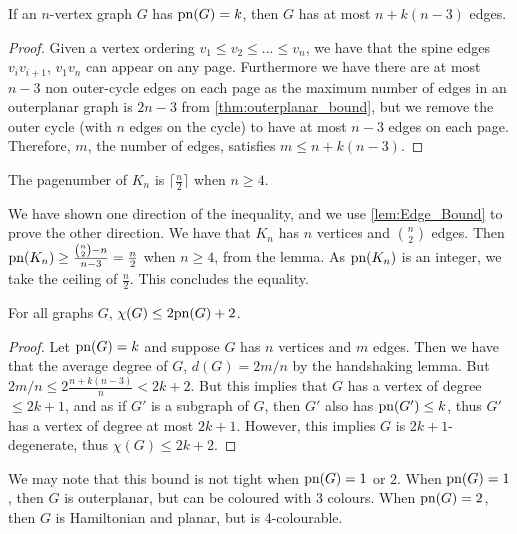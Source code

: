 \begin{lemma}\label{lem:Edge_Bound}
	If an $n$-vertex graph $G$ has $\text{pn}(G) = k$, then $G$ has at most $n + k(n-3)$ edges.
\end{lemma}
\begin{proof}
	Given a vertex ordering $v_1 \leq v_2 \leq ... \leq v_n$, we have that the spine edges $v_i v_{i + 1}$, $v_1 v_n$  can appear on any page. Furthermore we have there are at most $n-3$ non outer-cycle edges on each page as the maximum number of edges in an outerplanar graph is $2n - 3$ from \cref{thm:outerplanar_bound}, but we remove the outer cycle (with $n$ edges on the cycle) to have at most $n-3$ edges on each page. Therefore, $m$, the number of edges, satisfies $m \leq n + k (n - 3)$. 
\end{proof}

\begin{corollary}
	The pagenumber of $K_n$ is $\lceil \frac{n}{2} \rceil$ when $n \geq 4$.
\end{corollary}
We have shown one direction of the inequality, and we use \cref{lem:Edge_Bound} to prove the other direction. We have that $K_n$ has $n$ vertices and $\binom{n}{2}$ edges. Then $\text{pn}(K_n) \geq \frac{\binom{n}{2} - n}{n - 3} = \frac{n}{2}$ when $n \geq 4$, from the lemma. As $\text{pn}(K_n)$ is an integer, we take the ceiling of $\frac{n}{2}$. This concludes the equality. 
\begin{theorem}\label{thm:Colouring_Bound}
	For all graphs $G$, $\chi(G) \leq 2 \text{pn}(G) + 2$.
\end{theorem}
\begin{proof}
	Let $\text{pn}(G) = k$ and suppose $G$ has $n$ vertices and $m$ edges. Then we have that the average degree of $G$, $d(G) = 2m/n$ by the handshaking lemma. But $2m/n \leq 2 \frac{n + k(n-3)}{n} < 2k + 2$. But this implies that $G$ has a vertex of degree $\leq 2k + 1$, and as if $G'$ is a subgraph of $G$, then $G'$ also has $\text{pn}(G') \leq k$, thus $G'$ has a vertex of degree at most $2k + 1$. However, this implies $G$ is $2k + 1$-degenerate, thus $\chi(G) \leq 2k + 2$. 
\end{proof}
We may note that this bound is not tight when $\text{pn}(G) = 1$ or $2$. When $\text{pn}(G) = 1$, then $G$ is outerplanar, but can be coloured with 3 colours. When $\text{pn}(G) = 2$, then $G$ is Hamiltonian and planar, but is 4-colourable. 

